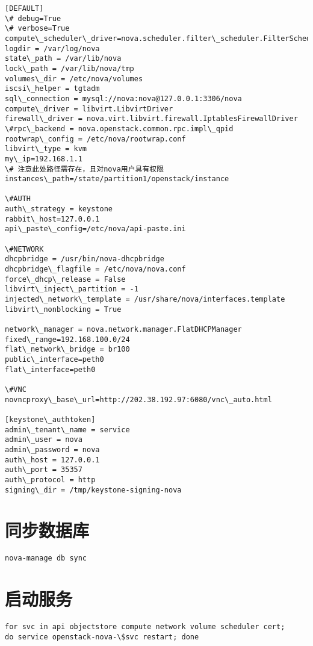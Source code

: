 \documentclass[letterpaper,10pt,english]{sphinxmanual}
\begin{document}
\begin{Verbatim}[commandchars=\\\{\}]
[DEFAULT]
\# debug=True
\# verbose=True
compute\_scheduler\_driver=nova.scheduler.filter\_scheduler.FilterScheduler
logdir = /var/log/nova
state\_path = /var/lib/nova
lock\_path = /var/lib/nova/tmp
volumes\_dir = /etc/nova/volumes
iscsi\_helper = tgtadm
sql\_connection = mysql://nova:nova@127.0.0.1:3306/nova
compute\_driver = libvirt.LibvirtDriver
firewall\_driver = nova.virt.libvirt.firewall.IptablesFirewallDriver
\#rpc\_backend = nova.openstack.common.rpc.impl\_qpid
rootwrap\_config = /etc/nova/rootwrap.conf
libvirt\_type = kvm
my\_ip=192.168.1.1
\# 注意此处路径需存在，且对nova用户具有权限
instances\_path=/state/partition1/openstack/instance

\#AUTH
auth\_strategy = keystone
rabbit\_host=127.0.0.1
api\_paste\_config=/etc/nova/api-paste.ini

\#NETWORK
dhcpbridge = /usr/bin/nova-dhcpbridge
dhcpbridge\_flagfile = /etc/nova/nova.conf
force\_dhcp\_release = False
libvirt\_inject\_partition = -1
injected\_network\_template = /usr/share/nova/interfaces.template
libvirt\_nonblocking = True

network\_manager = nova.network.manager.FlatDHCPManager
fixed\_range=192.168.100.0/24
flat\_network\_bridge = br100
public\_interface=peth0
flat\_interface=peth0

\#VNC
novncproxy\_base\_url=http://202.38.192.97:6080/vnc\_auto.html

[keystone\_authtoken]
admin\_tenant\_name = service
admin\_user = nova
admin\_password = nova
auth\_host = 127.0.0.1
auth\_port = 35357
auth\_protocol = http
signing\_dir = /tmp/keystone-signing-nova
\end{Verbatim}


\section{同步数据库}
\label{nova:id5}
\begin{Verbatim}[commandchars=\\\{\}]
nova-manage db sync
\end{Verbatim}


\section{启动服务}
\label{nova:id6}
\begin{Verbatim}[commandchars=\\\{\}]
for svc in api objectstore compute network volume scheduler cert;
do service openstack-nova-\$svc restart; done
\end{Verbatim}
\end{document}
